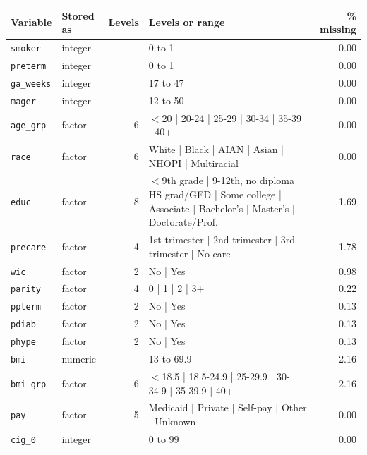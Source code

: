 {\small
\begin{longtable}{llrp{7.2cm}r}
\toprule
Variable & Stored as & Levels & Levels or range & \% missing \\
\midrule
\endhead
\texttt{smoker} & integer &  & 0 to 1 & 0.00 \\
\texttt{preterm} & integer &  & 0 to 1 & 0.00 \\
\texttt{ga\_weeks} & integer &  & 17 to 47 & 0.00 \\
\texttt{mager} & integer &  & 12 to 50 & 0.00 \\
\texttt{age\_grp} & factor & 6 & $<$20 | 20-24 | 25-29 | 30-34 | 35-39 | 40+ & 0.00 \\
\texttt{race} & factor & 6 & White | Black | AIAN | Asian | NHOPI | Multiracial & 0.00 \\
\texttt{educ} & factor & 8 & $<$9th grade | 9-12th, no diploma | HS grad/GED | Some college | Associate | Bachelor's | Master's | Doctorate/Prof. & 1.69 \\
\texttt{precare} & factor & 4 & 1st trimester | 2nd trimester | 3rd trimester | No care & 1.78 \\
\texttt{wic} & factor & 2 & No | Yes & 0.98 \\
\texttt{parity} & factor & 4 & 0 | 1 | 2 | 3+ & 0.22 \\
\texttt{ppterm} & factor & 2 & No | Yes & 0.13 \\
\texttt{pdiab} & factor & 2 & No | Yes & 0.13 \\
\texttt{phype} & factor & 2 & No | Yes & 0.13 \\
\texttt{bmi} & numeric &  & 13 to 69.9 & 2.16 \\
\texttt{bmi\_grp} & factor & 6 & $<$18.5 | 18.5-24.9 | 25-29.9 | 30-34.9 | 35-39.9 | 40+ & 2.16 \\
\texttt{pay} & factor & 5 & Medicaid | Private | Self-pay | Other | Unknown & 0.00 \\
\texttt{cig\_0} & integer &  & 0 to 99 & 0.00 \\
\bottomrule
\end{longtable}
}
